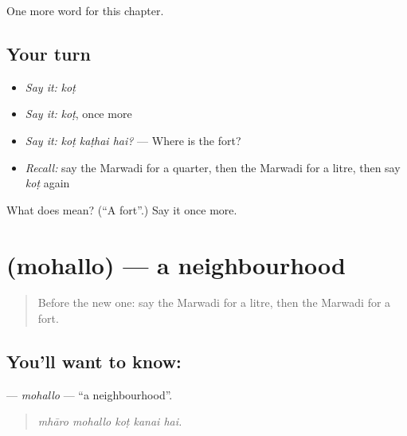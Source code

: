 \begin{grammarlens}[title={What you've built}]
One more word for this chapter.
\end{grammarlens}

\subsection*{Your turn}
\begin{itemize}
\raggedright
  \item \emph{Say it:} \emph{koṭ}
  \item \emph{Say it:} \emph{koṭ}, once more
  \item \emph{Say it:} \emph{koṭ kaṭhai hai?} — Where is the fort?
  \item \emph{Recall:} say the Marwadi for a quarter, then the Marwadi for a litre, then say \emph{koṭ} again
\end{itemize}

\begin{tcolorbox}[breakable,colback=teal!4,colframe=teal!35!black,title={Before you move on}]
What does  mean? (\textquotedblleft{}A fort\textquotedblright{}.) Say it once more.
\end{tcolorbox}
\section[\texorpdfstring{\mw{मोहल्लो} (mohallo)}{मोहल्लो (mohallo)}]{ (mohallo) — a neighbourhood}

\label{lesson:MW-C201-mohallo}



\begin{quote}
Before the new one: say the Marwadi for a litre, then the Marwadi for a fort.
\end{quote}

\subsection*{You'll want to know: }
\textbf{} — \emph{mohallo} — \textquotedblleft{}a neighbourhood\textquotedblright{}.

\begin{quote}
    
\end{quote}

\begin{quote}
\emph{mhāro mohallo koṭ kanai hai.}
\end{quote}

